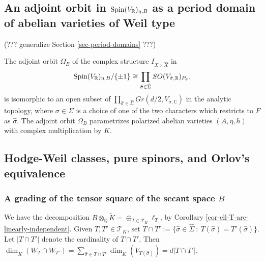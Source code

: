 \documentclass[12pt]{amsart}
\numberwithin{equation}{subsection}
\theoremstyle{plain}
\newtheorem{lem}[thm]{Lemma}
\theoremstyle{definition}
\newcommand{\CC}{{\mathbb C}}
\newcommand{\QQ}{{\mathbb Q}}
\newcommand{\R}{{\mathcal R}}
\newcommand{\RR}{{\mathbb R}}
\newcommand{\T}{{\mathcal T}}
\newcommand{\Spin}{{\rm Spin}}
\begin{document}
{%



%
\subsection{An adjoint orbit in $\Spin(V_\RR)_{\eta,B}$ as a period domain of abelian varieties of Weil type}
\label{sec-adjoint-orbit-n-Spin-V-RR-eta-B}
(??? generalize Section \ref{sec-period-domains} ???)

The adjoint orbit $\Omega_B$ of the complex structure $I_{X\times\hat{X}}$ in 
\[
\Spin(V_\RR)_{\eta,B}/\{\pm 1\}\cong \prod_{\hat{\sigma}\in\hat{\Sigma}}SO(V_{\hat{\sigma},\RR})_{P_{\hat{\sigma}}},
\]
is isomorphic to an open subset of 
$\prod_{\hat{\sigma}\in\hat{\Sigma}}Gr(d/2,V_{\sigma,\CC})$
in the analytic topology, where $\sigma\in\Sigma$ is a choice of one of the two characters which restricts to $F$ as $\hat{\sigma}$. The adjoint orbit $\Omega_B$ parametrizes polarized abelian  varieties $(A,\eta,h)$ with complex multiplication by $K$.


% 
\subsection{Hodge-Weil classes, pure spinors, and Orlov's equivalence}
% 
\subsubsection{A grading of the tensor square of the secant space $B$}
We have the decomposition $B\otimes_\QQ\tilde{K}=\oplus_{T\in\T_K}\ell_T$, by Corollary \ref{cor-ell-T-are-linearly-independent}.
Given $T,T'\in\T_K$, set $T\cap T':=\{\hat{\sigma}\in\hat{\Sigma} \ : \ T(\hat{\sigma})=T'(\hat{\sigma})\}$.
Let $|T\cap T'|$ denote the cardinality of $T\cap T'$. 
Then $\dim_{\tilde{K}}(W_T\cap W_{T'})=\sum_{\hat{\sigma}\in T\cap T'}\dim_{\tilde{K}}(V_{T(\hat{\sigma})})=d|T\cap T'|$.

}
\end{document}
